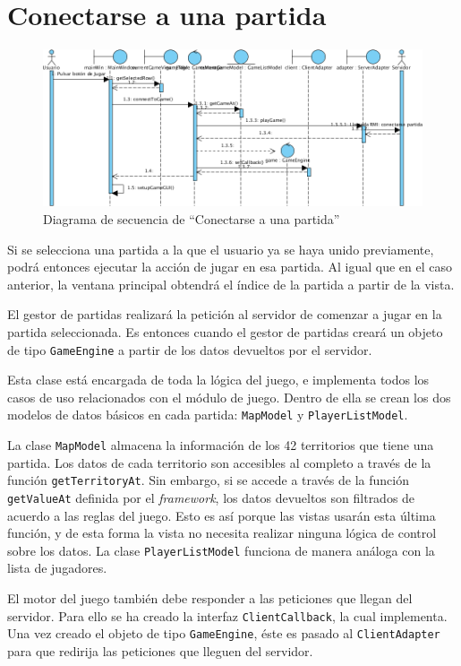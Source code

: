 \section{Conectarse a una partida}

\begin{figure}[ht]
\centering
\includegraphics[scale=0.6]{img/ch03devel-playgame.png}
\caption{Diagrama de secuencia de ``Conectarse a una partida''}
\end{figure}

Si se selecciona una partida a la que el usuario ya se haya unido previamente,
podrá entonces ejecutar la acción de jugar en esa partida. Al igual que en el
caso anterior, la ventana principal obtendrá el índice de la partida a partir
de la vista.

El gestor de partidas realizará la petición al servidor de comenzar a jugar en
la partida seleccionada. Es entonces cuando el gestor de partidas creará un
objeto de tipo \texttt{GameEngine} a partir de los datos devueltos por el
servidor.

Esta clase está encargada de toda la lógica del juego, e implementa todos los
casos de uso relacionados con el módulo de juego. Dentro de ella se crean los
dos modelos de datos básicos en cada partida: \texttt{MapModel} y
\texttt{PlayerListModel}.

La clase \texttt{MapModel} almacena la información de los 42 territorios que
tiene una partida. Los datos de cada territorio son accesibles al completo a
través de la función \texttt{getTerritoryAt}. Sin embargo, si se accede a través
de la función \texttt{getValueAt} definida por el \textit{framework}, los datos
devueltos son filtrados de acuerdo a las reglas del juego. Esto es así porque
las vistas usarán esta última función, y de esta forma la vista no necesita
realizar ninguna lógica de control sobre los datos. La clase
\texttt{PlayerListModel} funciona de manera análoga con la lista de jugadores.

El motor del juego también debe responder a las peticiones que llegan del
servidor. Para ello se ha creado la interfaz \texttt{ClientCallback}, la cual
implementa. Una vez creado el objeto de tipo \texttt{GameEngine}, éste es
pasado al \texttt{ClientAdapter} para que redirija las peticiones que lleguen
del servidor.

